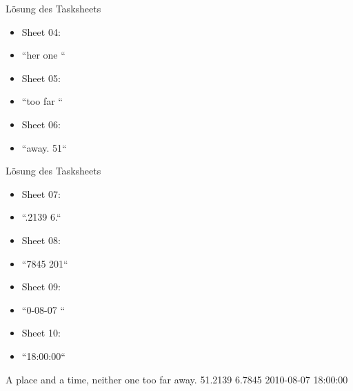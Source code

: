 \begin {frame}[<+->]{Lösung des Tasksheets}
	\begin{itemize}
	\item Sheet 04:
	\item ``her one ``
	\item Sheet 05:
	\item ``too far ``
	\item Sheet 06:
	\item ``away. 51`` 
	\end{itemize}
\end{frame}

\begin {frame}[<+->]{Lösung des Tasksheets}
	\begin{itemize}
	\item Sheet 07:
	\item ``.2139 6.``
	\item Sheet 08:
	\item ``7845 201``
	\item Sheet 09:
	\item ``0-08-07 `` 
	\item Sheet 10:
	\item ``18:00:00``
	\end{itemize}
\end{frame}

\begin{frame}{A place and a time, neither one too far away.}
	\hfill 51.2139 6.7845 2010-08-07 18:00:00 \hfill\hbox{}
\end{frame}
